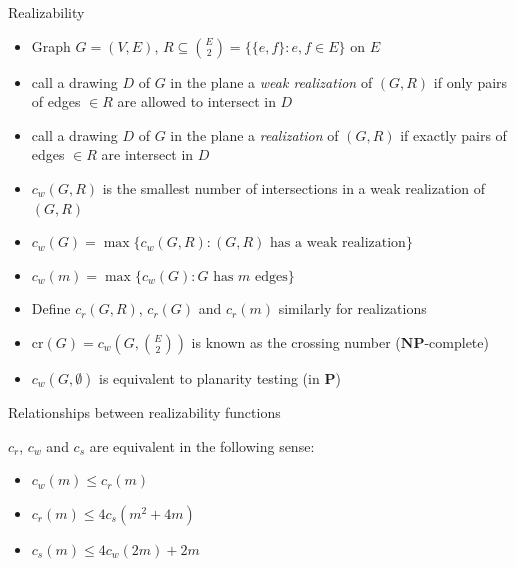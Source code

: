 \documentclass[10pt,aspectratio=169]{beamer}
\theoremstyle{plain}
\newcommand{\set}[1]{\{#1\}}
\begin{document}
\begin{frame}{Realizability}
    \begin{itemize}
        \item Graph \(G = (V, E)\), \(R \subseteq \binom{E}{2} = \set{\set{e, f} : e, f \in E} \) on \(E\)
        \item call a drawing \(D\) of \(G\) in the plane a \textit{weak realization} of \((G, R)\) if only pairs of edges \(\in R\) are allowed to intersect in \(D\)
        \item call a drawing \(D\) of \(G\) in the plane a \textit{realization} of \((G, R)\) if exactly pairs of edges \(\in R\) are intersect in \(D\)
        \pause
        \item \(c_w(G, R)\) is the smallest number of intersections in a weak realization of \((G, R)\)
        \item \(c_w(G) = \max\set{c_w(G, R) : (G, R) \text{ has a weak realization}} \)
        \item \(c_w(m) = \max\set{c_w(G) : G \text{ has } m \text{ edges}}\)
        \item Define \(c_r(G, R)\), \(c_r(G)\) and \(c_r(m)\) similarly for realizations
        \pause
        \item \(\mathrm{cr}(G) = c_w(G, \binom{E}{2})\) is known as the crossing number (\(\mathbf{NP}\)-complete)
        \item \(c_w(G, \emptyset)\) is equivalent to planarity testing (in \(\mathbf{P}\))
    \end{itemize}
\end{frame}

\begin{frame}{Relationships between realizability functions}
    \begin{lemma}
        \(c_r\), \(c_w\) and \(c_s\) are equivalent in the following sense:
        \begin{itemize}
            \item \(c_w(m) \leq c_r(m)\)
            \item \(c_r(m) \leq 4 c_s(m^2 + 4m)\)
            \item \(c_s(m) \leq 4 c_w(2m) + 2m\)
        \end{itemize}
        \label{lem:pol-equivalent}
    \end{lemma}
\end{frame}
\end{document}
